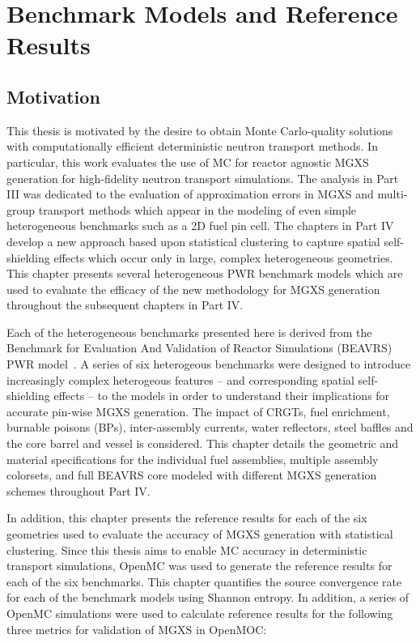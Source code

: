 \chapter{Benchmark Models and Reference Results}
\label{chap:benchmarks}

\section{Motivation}
\label{sec:chap7-motivate}

This thesis is motivated by the desire to obtain Monte Carlo-quality solutions with computationally efficient deterministic neutron transport methods. In particular, this work evaluates the use of \ac{MC} for reactor agnostic \ac{MGXS} generation for high-fidelity neutron transport simulations. The analysis in Part III was dedicated to the evaluation of approximation errors in \ac{MGXS} and multi-group transport methods which appear in the modeling of even simple heterogeneous benchmarks such as a 2D fuel pin cell. The chapters in Part IV develop a new approach based upon statistical clustering to capture spatial self-shielding effects which occur only in large, complex heterogeneous geometries. This chapter presents several heterogeneous \ac{PWR} benchmark models which are used to evaluate the efficacy of the new methodology for \ac{MGXS} generation throughout the subsequent chapters in Part IV.

Each of the heterogeneous benchmarks presented here is derived from the Benchmark for Evaluation And Validation of Reactor Simulations (BEAVRS) \ac{PWR} model~\cite{horelik2013beavrs}. A series of six heterogeous benchmarks were designed to introduce increasingly complex heterogeous features -- and corresponding spatial self-shielding effects -- to the models in order to understand their implications for accurate pin-wise \ac{MGXS} generation. The impact of \ac{CRGTs}, fuel enrichment, burnable poisons (BPs), inter-assembly currents, water reflectors, steel baffles and the core barrel and vessel is considered. This chapter details the geometric and material specifications for the individual fuel assemblies, multiple assembly colorsets, and full \ac{BEAVRS} core modeled with different \ac{MGXS} generation schemes throughout Part IV.

In addition, this chapter presents the reference results for each of the six geometries used to evaluate the accuracy of \ac{MGXS} generation with statistical clustering. Since this thesis aims to enable \ac{MC} accuracy in deterministic transport simulations, OpenMC was used to generate the reference results for each of the six benchmarks. This chapter quantifies the source convergence rate for each of the benchmark models using Shannon entropy. In addition, a series of OpenMC simulations were used to calculate reference results for the following three metrics for validation of \ac{MGXS} in OpenMOC:

